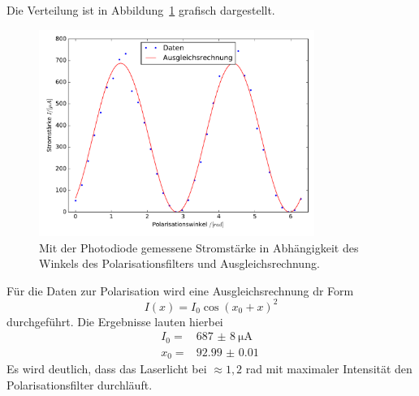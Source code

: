 %
Die Verteilung ist in Abbildung~\ref{fig:polarisation} grafisch dargestellt.
%
\begin{figure}[htb]
  \centering
  \includegraphics[width=0.8\textwidth]{auswertung/plot_polarisation.pdf}
  \caption{Mit der Photodiode gemessene Stromstärke in Abhängigkeit des Winkels des Polarisationsfilters und Ausgleichsrechnung.}
  \label{fig:polarisation}
\end{figure}
%
Für die Daten zur Polarisation wird eine Ausgleichsrechnung dr Form
%
\begin{equation}
  I(x)=I_0\cos(x_0+x)^2
\end{equation}
%
durchgeführt. Die Ergebnisse lauten hierbei
%
\begin{align*}
  I_0=&\SI{687(8)}{\micro\ampere} \\
  x_0=&\SI{92.99(1)}{}
\end{align*}
%
Es wird deutlich, dass das Laserlicht bei $\approx 1,2$ rad mit maximaler Intensität den Polarisationsfilter durchläuft.
%
